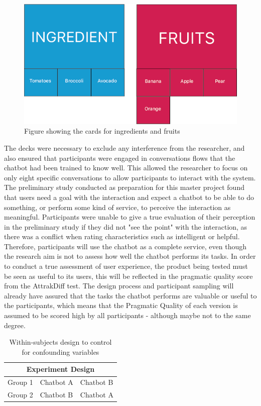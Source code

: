      \begin{figure}[h]
            \centering
            \includegraphics[scale=0.5]{figures/Ingredientfruit.png}
            \caption{Figure showing the cards for ingredients and fruits}
            \label{fig:ingfruit}
        \end{figure}

   The decks were necessary to exclude any interference from the researcher, and also ensured that participants were engaged in conversations flows that the chatbot had been trained to know well. This allowed the researcher to focus on only eight specific conversations to allow participants to interact with the system. The preliminary study conducted as preparation for this master project found that users need a goal with the interaction and expect a chatbot to be able to do something, or perform some kind of service, to perceive the interaction as meaningful. Participants were unable to give a true evaluation of their perception in the preliminary study if they did not "see the point" with the interaction, as there was a conflict when rating characteristics such as intelligent or helpful. Therefore, participants will use the chatbot as a complete service, even though the research aim is not to assess how well the chatbot performs its tasks. In order to conduct a true assessment of user experience, the product being tested must be seen as useful to its users, this will be reflected in the pragmatic quality score from the AttrakDiff test. The design process and participant sampling will already have assured that the tasks the chatbot performs are valuable or useful to the participants, which means that the Pragmatic Quality of each version is assumed to be scored high by all participants - although maybe not to the same degree.
   
   \begin{table}[h]
    \begin{tabular}{ |p{3cm}||p{5cm}||p{5cm}| }
    \hline
    \multicolumn{3}{|c|}{Experiment Design} \\
    \hline
    Group 1 &   Chatbot A & Chatbot B \\
    \hline   
    Group 2 &   Chatbot B & Chatbot A \\
    \hline
    \end{tabular}
    \caption{Within-subjects design to control for confounding variables}
    \label{table:4}
    \end{table}
   
